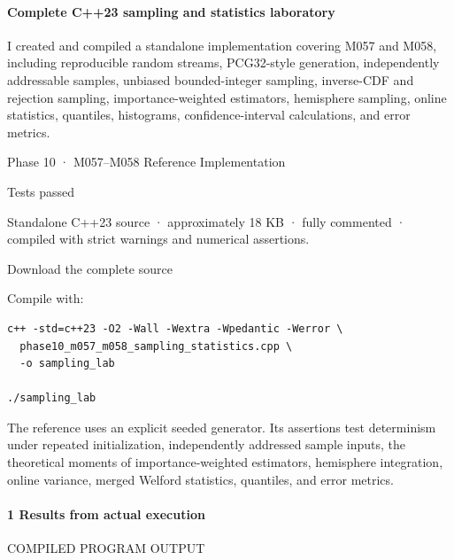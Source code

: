 \paragraph{Complete C++23 sampling and statistics laboratory}\label{02-foundations-ii-ch039-complete-c23-sampling-and-statistics-laboratory}

I created and compiled a standalone implementation covering M057 and M058, including reproducible random streams, PCG32-style generation, independently addressable samples, unbiased bounded-integer sampling, inverse-CDF and rejection sampling, importance-weighted estimators, hemisphere sampling, online statistics, quantiles, histograms, confidence-interval calculations, and error metrics.

Phase 10 · M057--M058 Reference Implementation

Tests passed

Standalone C++23 source · approximately 18 KB · fully commented · compiled with strict warnings and numerical assertions.

Download the complete source

Compile with:

\begin{verbatim}
c++ -std=c++23 -O2 -Wall -Wextra -Wpedantic -Werror \
  phase10_m057_m058_sampling_statistics.cpp \
  -o sampling_lab

./sampling_lab
\end{verbatim}

The reference uses an explicit seeded generator. Its assertions test determinism under repeated initialization, independently addressed sample inputs, the theoretical moments of importance-weighted estimators, hemisphere integration, online variance, merged Welford statistics, quantiles, and error metrics.

\paragraph{1 Results from actual execution}\label{02-foundations-ii-ch039-results-from-actual-execution}

COMPILED PROGRAM OUTPUT

